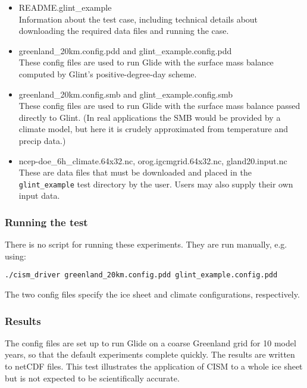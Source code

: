 \begin{itemize}
	\item README.glint\_example \\
         Information about the test case, including technical details about downloading the required data files
         and running the case.
  	\item greenland\_20km.config.pdd and glint\_example.config.pdd \\
  	 These config files are used to run Glide with the surface mass balance computed by Glint's positive-degree-day scheme.
  	\item greenland\_20km.config.smb and glint\_example.config.smb \\
  	 These config files are used to run Glide with the surface mass balance passed directly to Glint.
         (In real applications the SMB would be provided by a climate model, but here it is crudely approximated from
         temperature and precip data.)
  	\item  ncep-doe\_6h\_climate.64x32.nc, orog.igcmgrid.64x32.nc, gland20.input.nc \\
    	 These are data files that must be downloaded and placed in the \texttt{glint\_example} test directory by the user.
         Users may also supply their own input data.
\end{itemize}

\subsubsection{Running the test}
There is no script for running these experiments. They are run manually, e.g. using: 

\texttt{./cism\_driver greenland\_20km.config.pdd glint\_example.config.pdd}

The two config files specify the ice sheet and climate configurations, respectively. 

\subsubsection{Results}

The config files are set up to run Glide on a coarse Greenland grid for 10 model years,
so that the default experiments complete quickly.  The results are written to netCDF files.
This test illustrates the application of CISM to a whole ice sheet but is not expected
to be scientifically accurate.

